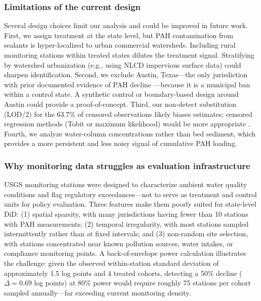 \documentclass[12pt]{article}
\begin{document}
\subsubsection*{Limitations of the current design} Several design choices limit our analysis and could be improved in future work. First, we assign treatment at the state level, but PAH contamination from sealants is hyper-localized to urban commercial watersheds. Including rural monitoring stations within treated states dilutes the treatment signal. Stratifying by watershed urbanization (e.g., using NLCD impervious surface data) could sharpen identification. Second, we exclude Austin, Texas---the only jurisdiction with prior documented evidence of PAH decline \citep{vanmetre2012use}---because it is a municipal ban within a control state. A synthetic control or boundary-based design around Austin could provide a proof-of-concept. Third, our non-detect substitution (LOD/2) for the 63.7\% of censored observations likely biases estimates; censored regression methods (Tobit or maximum likelihood) would be more appropriate \citep{helsel2012statistics}. Fourth, we analyze water-column concentrations rather than bed sediment, which provides a more persistent and less noisy signal of cumulative PAH loading.

\subsubsection*{Why monitoring data struggles as evaluation infrastructure} USGS monitoring stations were designed to characterize ambient water quality conditions and flag regulatory exceedances---not to serve as treatment and control units for policy evaluation. Three features make them poorly suited for state-level DiD: (1) spatial sparsity, with many jurisdictions having fewer than 10 stations with PAH measurements; (2) temporal irregularity, with most stations sampled intermittently rather than at fixed intervals; and (3) non-random site selection, with stations concentrated near known pollution sources, water intakes, or compliance monitoring points. A back-of-envelope power calculation illustrates the challenge: given the observed within-station standard deviation of approximately 1.5 log points and 4 treated cohorts, detecting a 50\% decline ($\Delta = 0.69$ log points) at 80\% power would require roughly 75 stations per cohort sampled annually---far exceeding current monitoring density.
\end{document}
